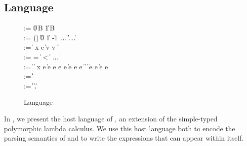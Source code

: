 \subsection{\Implang{} Language}
\label{sec:host-lang}
\begin{figure}[tp]
\small
\begin{bnf}
       \::= \cdot \| 0\,B \| 1\,B \\ 
    \::=
      () \| \itrue \| \ifalse \| 0 \| 1 \| -1 \| \dots \nlalt
      \ierr \| \data \| \off \| \iok \| \iecerr \| \iecpc \| \ldots \\

    \::= 
      \const \| %
       {\nrm x} e \| \ipair v v \nlalt
       \|  \|
       \\

    \::= 
      = \; \| \; < \; \| \inotop %
      \| \ldots \\

    \::= 
      \const \| \var \|  \|
       {\nrm x} e \| 
      \iapp e e \nlalt
       e \; e \|
      \iif e \; \ithen e \; \ielse e \nlalt
       \|  \|
       \|  \nlalt
       \nlalt
       \| \iappend e e \| \isub e {\nrm e}
      \\
      
    \::= 
      \iunitty \| \iboolty \| \iintty  \| 
      \invty \nlalt  \ibitsty \| \ioffty \| \iecty
  \\
   \meta{\ity} \::= 
      \ibasety \| \ityvar \| \iarrow \ity \ity \| \iprod \ity \ity \|
      \isum \ity \ity \nlalt
      \iseq \ity \| \forall \ityvar.\ity  \|
      \imu \ityvar \ity   
  
\end{bnf}
\caption{\Implang{} Language}
\label{fig:implang-syntax}
\end{figure}

In , we present the host language of \ddc{}, an
extension of the simple-typed polymorphic lambda calculus. 
We use this host language both to encode the parsing semantics of \ddc{} 
and to write the expressions that can appear within \ddc{} itself.

